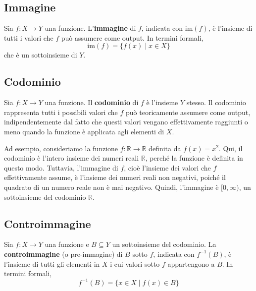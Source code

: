 \documentclass{book}
\begin{document}
\begin{definition}
    \subsection{Immagine}
    Sia \( f: X \rightarrow Y \) una funzione. L'\textbf{immagine} di \( f \), indicata con \( \text{im}(f) \), è l'insieme di tutti i valori che \( f \) può assumere come output. In termini formali,
    \[ \text{im}(f) = \{ f(x) \mid x \in X \} \]
    che è un sottoinsieme di \( Y \).
\end{definition}
\noindent\begin{minipage}{\textwidth}
    \begin{definition}
        \subsection{Codominio}
        Sia \( f: X \rightarrow Y \) una funzione. Il \textbf{codominio} di \( f \) è l'insieme \( Y \) stesso. Il codominio rappresenta tutti i possibili valori che \( f \) può teoricamente assumere come output, indipendentemente dal fatto che questi valori vengano effettivamente raggiunti o meno quando la funzione è applicata agli elementi di \( X \).

        Ad esempio, consideriamo la funzione \( f: \mathbb{R} \rightarrow \mathbb{R} \) definita da \( f(x) = x^2 \). Qui, il codominio è l'intero insieme dei numeri reali \( \mathbb{R} \), perché la funzione è definita in questo modo. Tuttavia, l'immagine di \( f \), cioè l'insieme dei valori che \( f \) effettivamente assume, è l'insieme dei numeri reali non negativi, poiché il quadrato di un numero reale non è mai negativo. Quindi, l'immagine è \( [0, \infty) \), un sottoinsieme del codominio \( \mathbb{R} \).
    \end{definition}
\end{minipage}

\begin{definition}
    \subsection{Controimmagine}
    Sia \( f: X \rightarrow Y \) una funzione e \( B \subseteq Y \) un sottoinsieme del codominio. La \textbf{controimmagine} (o pre-immagine) di \( B \) sotto \( f \), indicata con \( f^{-1}(B) \), è l'insieme di tutti gli elementi in \( X \) i cui valori sotto \( f \) appartengono a \( B \). In termini formali,
    \[ f^{-1}(B) = \{ x \in X \mid f(x) \in B \} \]
\end{definition}
\end{document}
